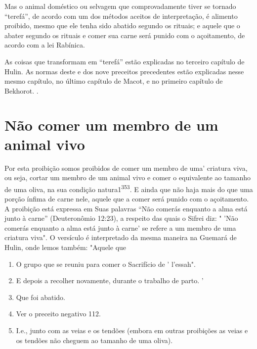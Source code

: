 Mas o animal doméstico ou selvagem que comprovadamente tiver se tornado
``terefá'', de acordo com um dos métodos aceitos de interpretação, é
alimento proibido, mesmo que ele tenha sido abatido segundo os rituais;
e aquele que o abater segundo os rituais e comer sua carne será punido
com o açoitamento, de acordo com a lei Rabínica.

As coisas que transformam em ``terefá'' estão explicadas no terceiro
capítulo de Hulin. As normas deste e dos nove preceitos precedentes
estão ex­plicadas nesse mesmo capítulo, no último capítulo de Macot, e
no primeiro ca­pítulo de Bekhorot. .

\section{Não comer um membro de um animal vivo}

Por esta proibição somos proibidos de comer um membro de uma' criatura
viva, ou seja, cortar um membro de um animal vivo e comer o equi­valente
ao tamanho de uma oliva, na sua condição natura1\textsuperscript{353}. E
ainda que não haja mais do que uma porção ínfima de carne nele, aquele
que a comer será punido com o açoitamento. A proibição está expressa em
Suas palavras ``Não comerás enquanto a alma está junto à carne''
(Deuteronômio 12:23), a respei­to das quais o Sifrei diz: " 'Não comerás
enquanto a alma está junto à carne' se refere a um membro de uma
criatura viva". O versículo é interpretado da mesma maneira na Guemará
de Hulin, onde lemos também: "Aquele que


\begin{enumerate}
\def\labelenumi{\arabic{enumi}.}
\setcounter{enumi}{348}
\item
 
 O grupo que se reuniu para comer o Sacrifício de ' l'essah".
 
\item
 
 E depois a recolher novamente, durante o trabalho de parto. '
 
\item
 
 Que foi abatido.
 
\item
 
 Ver o preceito negativo 112.
 
\item
 
 I.e., junto com as veias e os tendões (embora em outras proibições as
 veias e os tendões não cheguem ao tamanho de uma oliva).
 
\end{enumerate}



